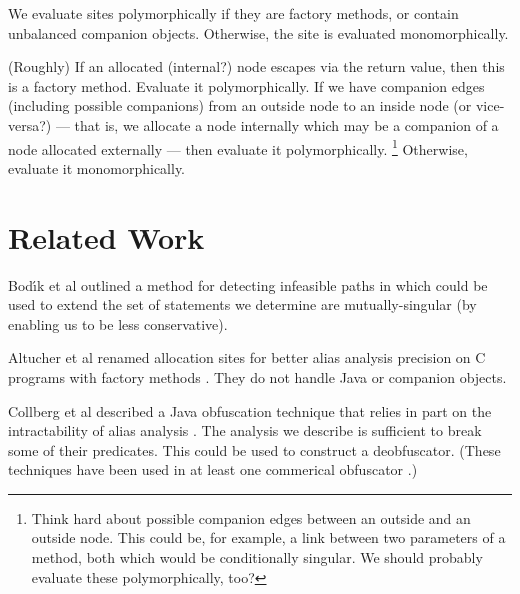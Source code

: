 \documentclass[11pt,notitlepage]{article}
\begin{document}
We evaluate sites polymorphically if they are factory methods, or
contain unbalanced companion objects.  Otherwise, the site is
evaluated monomorphically.

(Roughly) If an allocated (internal?) node escapes via the return
value, then this is a factory method.  Evaluate it polymorphically.
If we have companion edges (including possible companions) from
an outside node to an inside node (or vice-versa?) --- that is, we
allocate a node internally which may be a companion of a node allocated
externally --- then evaluate it polymorphically.%
\footnote{Think hard about possible companion edges between an
outside and an outside node.  This could be, for example, a
link between two parameters of a method, both which would be
conditionally singular.  We should probably evaluate these
polymorphically, too?}
Otherwise, evaluate it monomorphically.

\section{Related Work}

Bod{\'\i}k et al outlined a method for detecting infeasible paths
in \cite{267921} which could be used to extend the set of statements
we determine are mutually-singular (by enabling us to be less conservative).

Altucher et al renamed allocation sites for better alias analysis
precision on C programs with factory methods \cite{199466}.  They
do not handle Java or companion objects.

Collberg et al described a Java obfuscation technique that relies in
part on the intractability of alias analysis \cite{268962}.  The
analysis we describe is sufficient to break some of their predicates.
This could be used to construct a deobfuscator.  (These techniques
have been used in at least one commerical obfuscator \cite{humper02}.)



\end{document}
